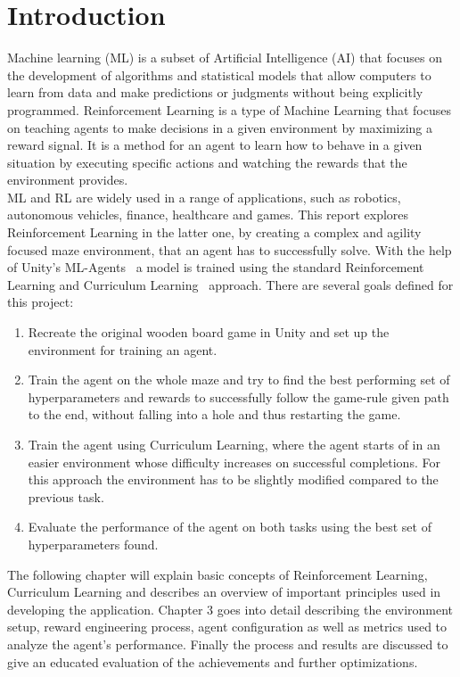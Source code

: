 
\section{Introduction}\label{sec:introduction}
Machine learning (ML) is a subset of Artificial Intelligence (AI) that focuses on the development of algorithms and statistical
models that allow computers to learn from data and make predictions or judgments without being explicitly programmed.
Reinforcement Learning is a type of Machine Learning that focuses on teaching agents to make decisions in a given environment
by maximizing a reward signal.
It is a method for an agent to learn how to behave in a given situation by executing specific
actions and watching the rewards that the environment provides.\\
ML and RL are widely used in a range of applications, such as robotics, autonomous vehicles, finance, healthcare and games.
This report explores Reinforcement Learning in the latter one, by creating a complex and agility focused maze environment,
that an agent has to successfully solve.
With the help of Unity's ML-Agents~\cite{juliani2020} a model is trained using the standard Reinforcement Learning and Curriculum Learning~\cite{narvekar_learning_2018} approach.
There are several goals defined for this project:
\begin{enumerate}
    \item Recreate the original wooden board game in Unity and set up the environment for training an agent.
    \item Train the agent on the whole maze and try to find the best performing set of hyperparameters and rewards to successfully
    follow the game-rule given path to the end, without falling into a hole and thus restarting the game.
    \item Train the agent using Curriculum Learning, where the agent starts of in an easier environment whose difficulty increases on successful completions.
    For this approach the environment has to be slightly modified compared to the previous task.
    \item Evaluate the performance of the agent on both tasks using the best set of hyperparameters found.
\end{enumerate}
The following chapter will explain basic concepts of Reinforcement Learning, Curriculum Learning and describes an overview
of important principles used in developing the application.
Chapter 3 goes into detail describing the environment setup, reward engineering process, agent configuration as well as metrics used
to analyze the agent's performance.
Finally the process and results are discussed to give an educated evaluation of the achievements and further optimizations.